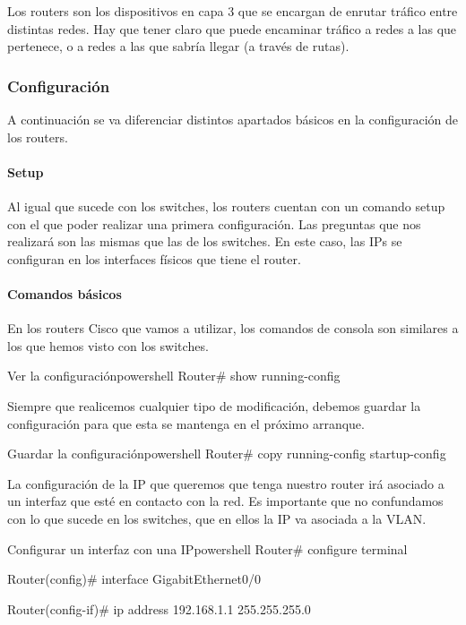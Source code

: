 Los routers son los dispositivos en capa 3 que se encargan de enrutar tráfico entre distintas redes. Hay que tener claro que puede encaminar tráfico a redes a las que pertenece, o a redes a las que sabría llegar (a través de rutas).

\subsubsection{Configuración}
A continuación se va  diferenciar distintos apartados básicos en la configuración de los routers.

\paragraph{Setup}
Al igual que sucede con los switches, los routers cuentan con un comando setup con el que poder realizar una primera configuración. Las preguntas que nos realizará son las mismas que las de los switches.
En este caso, las IPs se configuran en los interfaces físicos que tiene el router.


\paragraph{Comandos básicos}
En los routers Cisco que vamos a utilizar, los comandos de consola son similares a los que hemos visto con los switches.

\begin{mycode}{Ver la configuración}{powershell}{}
Router# show running-config
\end{mycode}

Siempre que realicemos cualquier tipo de modificación, debemos guardar la configuración para que esta se mantenga en el próximo arranque.

\begin{mycode}{Guardar la configuración}{powershell}{}
Router# copy running-config startup-config
\end{mycode}

La configuración de la IP que queremos que tenga nuestro router irá asociado a un interfaz que esté en contacto con la red. Es importante que no confundamos con lo que sucede en los switches, que en ellos la IP va asociada a la VLAN.

\begin{mycode}{Configurar un interfaz con una IP}{powershell}{}
Router# configure terminal

Router(config)# interface GigabitEthernet0/0

Router(config-if)# ip address 192.168.1.1 255.255.255.0
\end{mycode}


